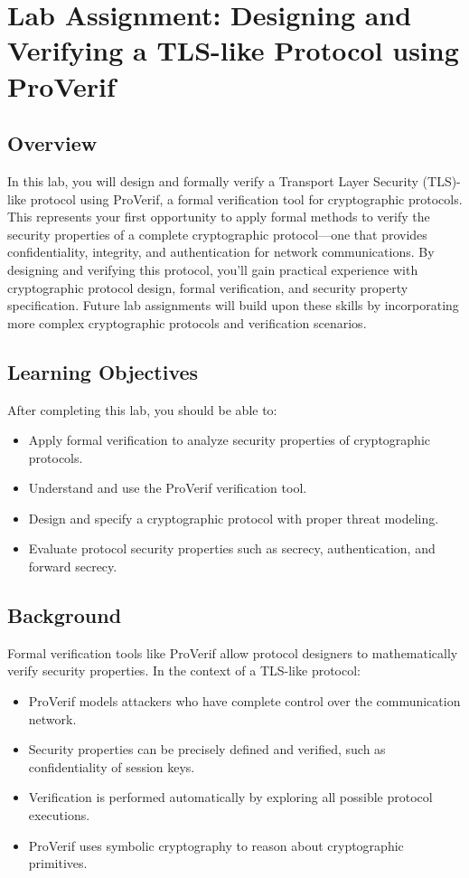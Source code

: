 \documentclass[10pt,a4paper,american]{article}
\begin{document}
\classhandoutheader

\section*{Lab Assignment: Designing and Verifying a TLS-like Protocol using ProVerif}

\subsection*{Overview}
In this lab, you will design and formally verify a Transport Layer Security (TLS)-like protocol using ProVerif, a formal verification tool for cryptographic protocols. This represents your first opportunity to apply formal methods to verify the security properties of a complete cryptographic protocol—one that provides confidentiality, integrity, and authentication for network communications. By designing and verifying this protocol, you'll gain practical experience with cryptographic protocol design, formal verification, and security property specification. Future lab assignments will build upon these skills by incorporating more complex cryptographic protocols and verification scenarios.

\subsection*{Learning Objectives}
After completing this lab, you should be able to:
\begin{itemize}
	\item Apply formal verification to analyze security properties of cryptographic protocols.
	\item Understand and use the ProVerif verification tool.
	\item Design and specify a cryptographic protocol with proper threat modeling.
	\item Evaluate protocol security properties such as secrecy, authentication, and forward secrecy.
\end{itemize}

\subsection*{Background}
Formal verification tools like ProVerif allow protocol designers to mathematically verify security properties. In the context of a TLS-like protocol:
\begin{itemize}
	\item ProVerif models attackers who have complete control over the communication network.
	\item Security properties can be precisely defined and verified, such as confidentiality of session keys.
	\item Verification is performed automatically by exploring all possible protocol executions.
	\item ProVerif uses symbolic cryptography to reason about cryptographic primitives.
\end{itemize}
\end{document}
